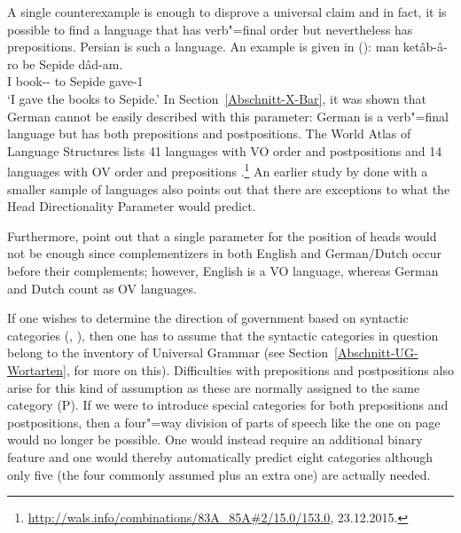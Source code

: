 \addlines[2]
A single counterexample is enough to disprove a universal  claim and in fact, it is possible to
find a language that has verb"=final order but nevertheless has prepositions.
Persian is such a language. An example is given in ():
\ea
\gll man ketâb-â-ro be Sepide dâd-am.\\
     I book-\pl-\RA{} to Sepide gave-1\sg\\
\glt `I gave the books to Sepide.'
\z
In Section~\ref{Abschnitt-X-Bar}, it was shown that German cannot be easily described with this parameter: German is a verb"=final language but has both
prepositions and postpositions. The World Atlas of Language Structures lists 41 languages with VO
order and postpositions and 14 languages with OV order and prepositions \citep{wals-83,wals-85}.\footnote{
  \url{http://wals.info/combinations/83A_85A\#2/15.0/153.0}, 23.12.2015.
} An earlier study by \citet{Dryer92a} done with a smaller sample of languages also points out that
there are exceptions to what the Head Directionality Parameter would predict. 

Furthermore, \citet[]{GW94a} point out that a single parameter for the position of heads would not be enough since complementizers in both English and German/Dutch
occur before their complements; however, English is a VO language, whereas German and Dutch count as OV languages.

If one wishes to determine the direction of government based on syntactic categories (\citealp[]{GW94a}, \citealp[]{Chomsky2005a}), then one has to assume
that the syntactic categories in question belong to the inventory of Universal Grammar (see Section~\ref{Abschnitt-UG-Wortarten}, for more on this).
Difficulties with prepositions and postpositions also arise for this kind of assumption as these are normally assigned to the same category (P).
If we were to introduce special categories for both prepositions and postpositions, then a four"=way
division of parts of speech like the one on page~\pageref{Tabelle-Merkmalszerlegung-Wortarten} would
no longer be possible. One would instead require an additional binary feature and one would thereby
automatically predict eight categories although only five (the four commonly assumed plus an extra one) are actually needed.

